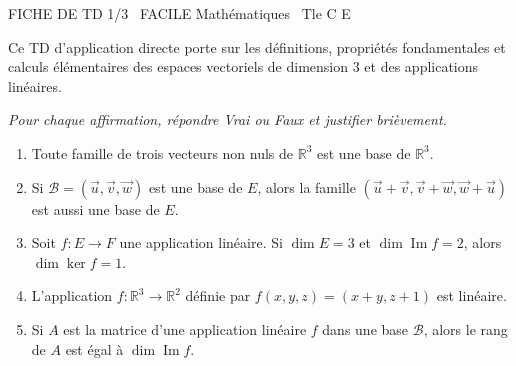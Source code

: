 \documentclass[11pt]{article}
\begin{document}
\begin{tcolorbox}[enhanced,colback=popink,colframe=popink,arc=10pt,boxrule=0pt,left=12pt,right=12pt,top=9pt,bottom=9pt]
{\color{white}\popxbold\small FICHE DE TD 1/3 \textbullet\ FACILE \hfill Mathématiques \textbullet\ Tle C E\par}
\end{tcolorbox}
\vspace{4pt}
Ce TD d'application directe porte sur les définitions, propriétés fondamentales et calculs élémentaires des espaces vectoriels de dimension 3 et des applications linéaires.

\begin{exercice}
\emph{Pour chaque affirmation, répondre Vrai ou Faux et justifier brièvement.}
\begin{enumerate}
    \item Toute famille de trois vecteurs non nuls de $\mathbb{R}^3$ est une base de $\mathbb{R}^3$.
    \item Si $\mathcal{B} = (\vec{u}, \vec{v}, \vec{w})$ est une base de $E$, alors la famille $(\vec{u}+\vec{v}, \vec{v}+\vec{w}, \vec{w}+\vec{u})$ est aussi une base de $E$.
    \item Soit $f : E \to F$ une application linéaire. Si $\dim E = 3$ et $\dim \operatorname{Im} f = 2$, alors $\dim \ker f = 1$.
    \item L'application $f : \mathbb{R}^3 \to \mathbb{R}^2$ définie par $f(x,y,z) = (x+y, z+1)$ est linéaire.
    \item Si $A$ est la matrice d'une application linéaire $f$ dans une base $\mathcal{B}$, alors le rang de $A$ est égal à $\dim \operatorname{Im} f$.
\end{enumerate}
\end{exercice}
\end{document}
